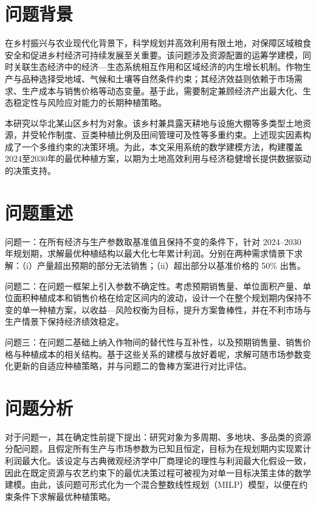 
\section{问题背景}

在乡村振兴与农业现代化背景下，科学规划并高效利用有限土地，对保障区域粮食安全和促进乡村经济可持续发展至关重要。该问题涉及资源配置的运筹学建模，同时关联生态经济中的经济—生态系统相互作用和区域经济的内生增长机制。作物生产与品种选择受地域、气候和土壤等自然条件约束；其经济效益则依赖于市场需求、生产成本与销售价格等动态变量。基于此，需要制定兼顾经济产出最大化、生态稳定性与风险应对能力的长期种植策略\cite{GZZP202402041}。

本研究以华北某山区乡村为对象。该乡村兼具露天耕地与设施大棚等多类型土地资源，并受轮作制度、豆类种植比例及田间管理可及性等多重约束。上述现实因素构成了一个多维约束的决策环境。为此，本文采用系统的数学建模方法，构建覆盖2024至2030年的最优种植方案，以期为土地高效利用与经济稳健增长提供数据驱动的决策支持。


\section{问题重述}

问题一：在所有经济与生产参数取基准值且保持不变的条件下，针对 2024–2030 年规划期，求解最优种植结构以最大化七年累计利润。分别在两种需求情景下求解：（i）产量超出预期的部分无法销售；（ii）超出部分以基准价格的 50\% 出售。

问题二：在问题一框架上引入参数不确定性。考虑预期销售量、单位面积产量、单位面积种植成本和销售价格在给定区间内的波动，设计一个在整个规划期内保持不变的单一种植方案，以收益—风险权衡为目标，提升方案鲁棒性，并在不利市场与生产情景下保持经济绩效稳定。

问题三：在问题二基础上纳入作物间的替代性与互补性，以及预期销售量、销售价格与种植成本的相关结构。基于这些关系的建模与放好着呢，求解可随市场参数变化更新的自适应种植策略，并与问题二的鲁棒方案进行对比评估。


\section{问题分析}

对于问题一，其在确定性前提下提出：研究对象为多周期、多地块、多品类的资源分配问题，且假定所有生产与市场参数为已知且恒定，目标为在规划期内实现累计利润最大化。该设定与古典微观经济学中厂商理论的理性与利润最大化假设一致，因此在既定资源与农艺约束下的最优决策过程可被视为对单一目标决策主体的数学建模。由此，该问题可形式化为一个混合整数线性规划（MILP）模型，以便在约束条件下求解最优种植策略。

